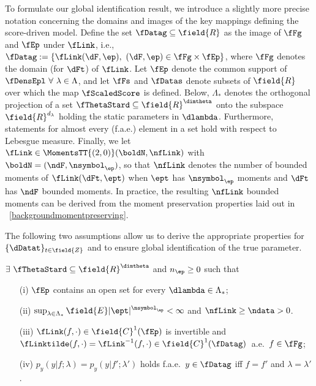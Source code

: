 To formulate our global identification result, we introduce a slightly more precise notation concerning the domains and images of the key mappings defining the score-driven model. Define the set  $\fDatag \subseteq \field{R}$ as the image of $\fFg$ and $\fEp$ under $\fLink$, i.e., $\fDatag:=\{\fLink(\dF,\ep), \ (\dF,\ep) \in\fFg \times \fEp\}$, where $\fFg$ denotes the domain (for $\dFt$) of $\fLink$. 
Let $\fEp$ denote the common support of $\fDensEpl \ \forall \ \lambda \in \Lambda$, and let $\fFs$ and $\fDatas$  denote subsets of $\field{R}$ over which the map $\fScaledScore$ is defined.  Below, $\Lambda_{*}$ denotes the orthogonal projection of a set $\fThetaStard \subseteq \field{R}^{\dimtheta}$ onto the subspace $\field{R}^{d_{\lambda}}$ holding the static parameters in $\dlambda$. Furthermore, statements for almost every (f.a.e.) element in a set hold with respect to Lebesgue measure. 
Finally, we let $\fLink \in \MomentsTT{(2,0)}(\boldN,\nfLink)$ with $\boldN=(\ndF,\nsymbol_\ep)$, so that $\nfLink$ denotes the number of bounded moments of $\fLink(\dFt,\ept)$ when $\ept$ has $\nsymbol_\ep$ moments and $\dFt$ has $\ndF$ bounded moments. In practice, the resulting $\nfLink$ bounded moments can be derived from the moment preservation properties laid out in \SupplementaryAppendix~\ref{backgroundmomentpreserving}.

The following two assumptions allow us to derive the appropriate properties for 
$\{\dDatat\}_{t\in \field{Z}}$ and 
to ensure global identification of the true parameter. 


%
%
%
%
\begin{ass}
\label{ass5}
$\exists \ \fThetaStard \subseteq \field{R}^{\dimtheta}$ and $n_\ep\geq 0$ such that 
\begin{enumerate}   
    \item[(i)] $\fEp$ contains an open set for every $\dlambda \in \Lambda_{*}$;
    \item[(ii)]$\sup_{\lambda \in \Lambda_{*}} \field{E} |\ept|^{\nsymbol_\ep}<\infty$ and $\nfLink \geq \ndata>0$.
\item[(iii)]  $\fLink(f,\cdot) \in \field{C}^{1}(\fEp)$ is invertible and $\fLinktilde(f,\cdot) = \fLink^{-1}(f,\cdot) \in \field{C}^{1}(\fDatag)$\ a.e.~$f \in\fFg$;
    \item[(iv)] $p_{y}(y|f;\lambda)=p_{y}(y|f';\lambda')$ holds f.a.e.~$y \in \fDatag$ iff $f=f'$ and $\lambda=\lambda'$. 
\end{enumerate}
\end{ass}

